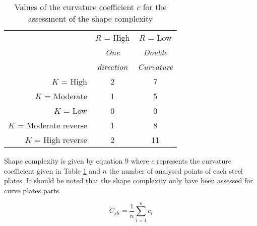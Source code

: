 \begin{table}
\caption{Values of the curvature coefficient $c$ for the assessment of the shape complexity}
\label{tabcompshape}
\begin{center}
\begin{tabular}{rcc}
\hline
           &   $R$ = High &    $R$ = Low \\

 &  {\it One} & {\it Double} \\

 & {\it direction} & {\it Curvature} \\
\hline
  $K$ = High &          2 &          7 \\

$K$ = Moderate &          1 &          5 \\

   $K$ = Low &          0 &          0 \\

$K$ = Moderate reverse &          1 &          8 \\

$K$ = High reverse &          2 &         11 \\
\hline
\end{tabular}
\end{center}
\end{table}


Shape complexity is given by equation 9 where $c$ represents the curvature coefficient given in Table \ref{tabcompshape} and $n$ the number of analysed points of each steel plates. It should be noted that the shape complexity only have been assessed for curve plates parts.


\begin{equation}
C_{sh} = \frac{1}{n} \sum_{i=1}^{n} c_i
\end{equation}